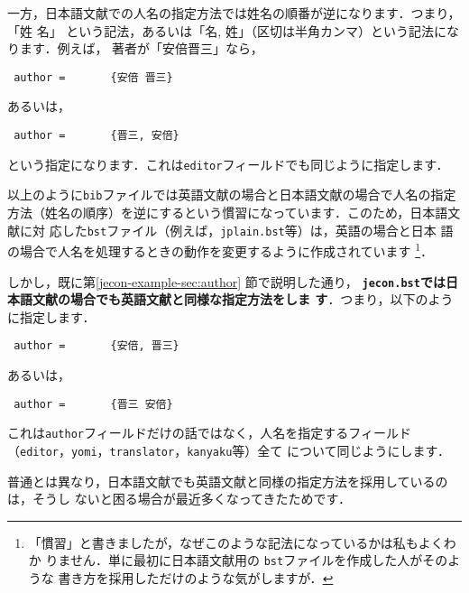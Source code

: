\documentclass[article]{jlreq}
\begin{document}
一方，日本語文献での人名の指定方法では姓名の順番が逆になります．つまり，「姓 名」
という記法，あるいは「名, 姓」（区切は半角カンマ）という記法になります．例えば，
著者が「安倍晋三」なら，
\begin{screen}
\begin{verbatim}
 author =       {安倍 晋三}
\end{verbatim}
\end{screen}
あるいは，
\begin{screen}
\begin{verbatim}
 author =       {晋三, 安倍}
\end{verbatim}
\end{screen}
という指定になります．これは\texttt{editor}フィールドでも同じように指定します．
\vspace*{1em}

以上のように\texttt{bib}ファイルでは英語文献の場合と日本語文献の場合で人名の指定
方法（姓名の順序）を逆にするという慣習になっています．このため，日本語文献に対
応した\texttt{bst}ファイル（例えば，\texttt{jplain.bst}等）は，英語の場合と日本
語の場合で人名を処理するときの動作を変更するように作成されています
\footnote{「慣習」と書きましたが，なぜこのような記法になっているかは私もよくわか
りません．単に最初に日本語文献用の \texttt{bst}ファイルを作成した人がそのような
書き方を採用しただけのような気がしますが．}．\vspace*{1em}

しかし，既に第\ref{jecon-example-sec:author} 節で説明した通り，
\textbf{\texttt{jecon.bst}では日本語文献の場合でも英語文献と同様な指定方法をしま
す}．つまり，以下のように指定します．
\begin{screen}
\begin{verbatim}
 author =       {安倍, 晋三}
\end{verbatim}
\end{screen}
あるいは，
\begin{screen}
\begin{verbatim}
 author =       {晋三 安倍}
\end{verbatim}
\end{screen}

これは\texttt{author}フィールドだけの話ではなく，人名を指定するフィールド
（\texttt{editor}，\texttt{yomi}，\texttt{translator}，\texttt{kanyaku}等）全て
について同じようにします．

\vspace*{1em}
普通とは異なり，日本語文献でも英語文献と同様の指定方法を採用しているのは，そうし
ないと困る場合が最近多くなってきたためです．
\end{document}
